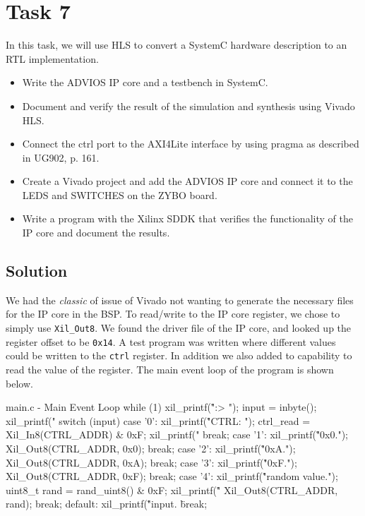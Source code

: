 \documentclass[../main.tex]{subfiles}
\begin{document}
\section{Task 7}

In this task, we will use HLS to convert a SystemC hardware description to an RTL implementation.

\begin{itemize}
    \item Write the ADVIOS IP core and a testbench in SystemC.
    \item Document and verify the result of the simulation and synthesis using Vivado HLS.
    \item Connect the ctrl port to the AXI4Lite interface by using pragma as described in UG902, p. 161.
    \item Create a Vivado project and add the ADVIOS IP core and connect it to the LEDS and SWITCHES on the ZYBO board.
    \item Write a program with the Xilinx SDDK that verifies the functionality of the IP core and document the results.
\end{itemize}

\subsection*{Solution}

\lipsum[1]

\newpage

We had the \textit{classic} of issue of Vivado not wanting to generate the necessary files for the IP core in the BSP. To read/write to the IP core register, we chose to simply use \texttt{Xil\_Out8}. We found the driver file of the IP core, and looked up the register offset to be \texttt{0x14}. A test program was written where different values could be written to the \texttt{ctrl} register. In addition we also added to capability to read the value of the register. The main event loop of the program is shown below.

\begin{myminted}{main.c - Main Event Loop}
while (1)
{
    xil_printf("\r\n\nCMD:> ");
    input = inbyte();
    xil_printf("%
    switch (input)
    {
        case '0':
            xil_printf("\r\nReading CTRL: ");
            ctrl_read = Xil_In8(CTRL_ADDR) & 0xF;
            xil_printf("%
            break;
        case '1':
            xil_printf("\r\nWriting 0x0.");
            Xil_Out8(CTRL_ADDR, 0x0);
            break;
        case '2':
            xil_printf("\r\nWriting 0xA.");
            Xil_Out8(CTRL_ADDR, 0xA);
            break;
        case '3':
            xil_printf("\r\nWriting 0xF.");
            Xil_Out8(CTRL_ADDR, 0xF);
            break;
        case '4':
            xil_printf("\r\nGenerating random value.");
            uint8_t rand = rand_uint8() & 0xF;
            xil_printf("\r\nWriting %
            Xil_Out8(CTRL_ADDR, rand);
            break;
        default:
            xil_printf("\r\nUnrecognized input. \"%
            break;
    }
}
\end{myminted}
\end{document}
